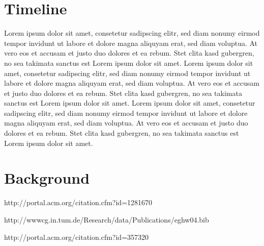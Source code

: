 \documentclass{acmsiggraph}
\begin{document}
\section{Timeline}

Lorem ipsum dolor sit amet, consetetur sadipscing elitr, sed diam
nonumy eirmod tempor invidunt ut labore et dolore magna aliquyam erat,
sed diam voluptua. At vero eos et accusam et justo duo dolores et ea
rebum. Stet clita kasd gubergren, no sea takimata sanctus est Lorem
ipsum dolor sit amet. Lorem ipsum dolor sit amet, consetetur
sadipscing elitr, sed diam nonumy eirmod tempor invidunt ut labore et
dolore magna aliquyam erat, sed diam voluptua. At vero eos et accusam
et justo duo dolores et ea rebum. Stet clita kasd gubergren, no sea
takimata sanctus est Lorem ipsum dolor sit amet. Lorem ipsum dolor sit
amet, consetetur sadipscing elitr, sed diam nonumy eirmod tempor
invidunt ut labore et dolore magna aliquyam erat, sed diam
voluptua. At vero eos et accusam et justo duo dolores et ea
rebum. Stet clita kasd gubergren, no sea takimata sanctus est Lorem
ipsum dolor sit amet.

\section{Background}

http://portal.acm.org/citation.cfm?id=1281670

http://wwwcg.in.tum.de/Research/data/Publications/eghw04.bib

http://portal.acm.org/citation.cfm?id=357320
\end{document}
